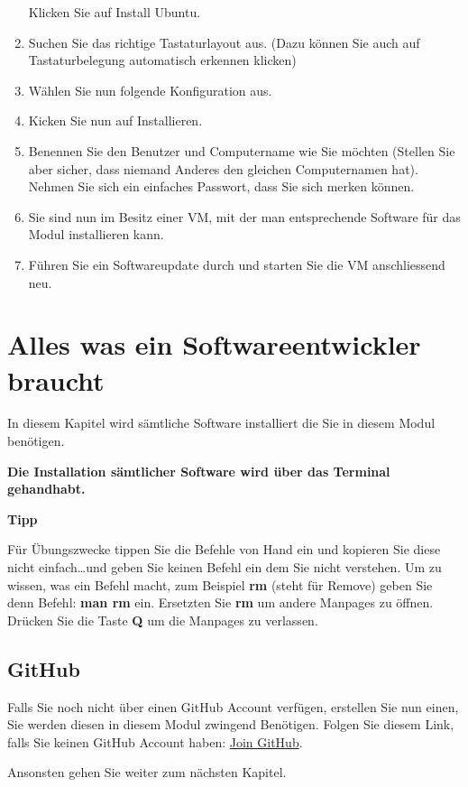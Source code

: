 \begin{frame}[fragile]
\begin{enumerate}
        Klicken Sie auf Install Ubuntu.
        \item Suchen Sie das richtige Tastaturlayout aus. (Dazu können Sie auch auf Tastaturbelegung automatisch erkennen klicken)
        \item Wählen Sie nun folgende Konfiguration aus.
        \item Kicken Sie nun auf Installieren.
        \item Benennen Sie den Benutzer und Computername wie Sie möchten (Stellen Sie aber sicher, dass niemand Anderes den gleichen Computernamen hat).
        Nehmen Sie sich ein einfaches Passwort, dass Sie sich merken können.
        \item Sie sind nun im Besitz einer VM, mit der man entsprechende Software für das Modul installieren kann.
        \item Führen Sie ein Softwareupdate durch und starten Sie die VM anschliessend neu.
    \end{enumerate}
\end{frame}


\section{Alles was ein Softwareentwickler braucht}\label{sec:software}
\begin{frame}[fragile]
    In diesem Kapitel wird sämtliche Software installiert die Sie in diesem Modul benötigen.

    \textbf{Die Installation sämtlicher Software wird über das Terminal gehandhabt.}

    \textbf{Tipp}
    \vSpaceStyle{0.1em}

    Für Übungszwecke tippen Sie die Befehle von Hand ein und kopieren Sie diese nicht einfach\ldots\space und geben Sie keinen
    Befehl ein dem Sie nicht verstehen.
    Um zu wissen, was ein Befehl macht, zum Beispiel \textbf{rm} (steht für Remove) geben Sie denn Befehl: \textbf{man rm} ein.
    Ersetzten Sie \textbf{rm} um andere Manpages zu öffnen.
    Drücken Sie die Taste \textbf{Q} um die Manpages zu verlassen.
\end{frame}

\subsection{GitHub}\label{subsec:github}
\begin{frame}[fragile]
    Falls Sie noch nicht über einen GitHub Account verfügen, erstellen Sie nun einen, Sie werden diesen in diesem Modul
    zwingend Benötigen.
    Folgen Sie diesem Link, falls Sie keinen GitHub Account haben: \href{https://github.com/join}{Join GitHub}.

    Ansonsten gehen Sie weiter zum nächsten Kapitel.
\end{frame}

